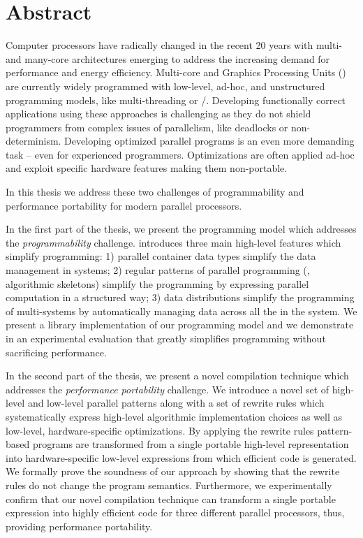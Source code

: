\chapter*{Abstract}\label{abstract}

Computer processors have radically changed in the recent 20 years with multi- and many-core architectures emerging to address the increasing demand for performance and energy efficiency.
Multi-core \CPUs and Graphics Processing Units (\GPUs) are currently widely programmed with low-level, ad-hoc, and unstructured programming models, like multi-threading or \OpenCL /\CUDA.
Developing functionally correct applications using these approaches is challenging as they do not shield programmers from complex issues of parallelism, like deadlocks or non-determinism.
Developing optimized parallel programs is an even more demanding task -- even for experienced programmers.
Optimizations are often applied ad-hoc and exploit specific hardware features making them non-portable.

In this thesis we address these two challenges of programmability and performance portability for modern parallel processors.

In the first part of the thesis, we present the \SkelCL programming model which addresses the \emph{programmability} challenge.
\SkelCL introduces three main high-level features which simplify \GPU programming:
1) parallel container data types simplify the data management in \GPU systems;
2) regular patterns of parallel programming (\aka, algorithmic skeletons) simplify the programming by expressing parallel computation in a structured way;
3) data distributions simplify the programming of multi-\GPU systems by automatically managing data across all the \GPUs in the system.
We present a \Cpp library implementation of our programming model and we demonstrate in an experimental evaluation that \SkelCL greatly simplifies \GPU programming without sacrificing performance.

In the second part of the thesis, we present a novel compilation technique which addresses the \emph{performance portability} challenge.
We introduce a novel set of high-level and low-level parallel patterns along with a set of rewrite rules which systematically express high-level algorithmic implementation choices as well as low-level, hardware-specific optimizations.
By applying the rewrite rules pattern-based programs are transformed from a single portable high-level representation into hardware-specific low-level expressions from which efficient \OpenCL code is generated.
We formally prove the soundness of our approach by showing that the rewrite rules do not change the program semantics.
Furthermore, we experimentally confirm that our novel compilation technique can transform a single portable expression into highly efficient code for three different parallel processors, thus, providing performance portability.

